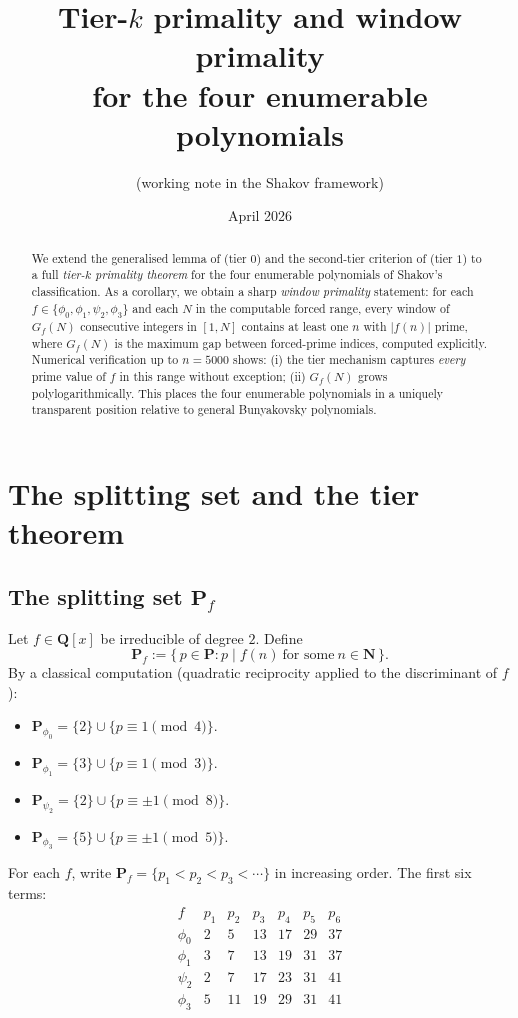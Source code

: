 \documentclass[11pt]{article}
\title{Tier-$k$ primality and window primality\\
for the four enumerable polynomials}
\author{(working note in the Shakov framework)}
\date{April 2026}
\theoremstyle{definition}
\newcommand{\N}{\mathbf{N}}
\newcommand{\Q}{\mathbf{Q}}
\newcommand{\PP}{\mathbf{P}}
\begin{document}
\maketitle

\begin{abstract}
We extend the generalised lemma of \cite{B8} (tier $0$) and the second-tier criterion of \cite[Theorem 5.1]{P2} (tier $1$) to a full \emph{tier-$k$ primality theorem} for the four enumerable polynomials of Shakov's classification. As a corollary, we obtain a sharp \emph{window primality} statement: for each $f \in \{\phi_0, \phi_1, \psi_2, \phi_3\}$ and each $N$ in the computable forced range, every window of $G_f(N)$ consecutive integers in $[1,N]$ contains at least one $n$ with $|f(n)|$ prime, where $G_f(N)$ is the maximum gap between forced-prime indices, computed explicitly. Numerical verification up to $n=5000$ shows: (i) the tier mechanism captures \emph{every} prime value of $f$ in this range without exception; (ii) $G_f(N)$ grows polylogarithmically. This places the four enumerable polynomials in a uniquely transparent position relative to general Bunyakovsky polynomials.
\end{abstract}

\tableofcontents

\section{The splitting set and the tier theorem}\label{sec:tier}

\subsection{The splitting set $\PP_f$}

Let $f \in \Q[x]$ be irreducible of degree $2$. Define
\[
\PP_f := \{\,p \in \PP : p \mid f(n)\ \text{for some}\ n \in \N\,\}.
\]
By a classical computation (quadratic reciprocity applied to the discriminant of $f$):
\begin{itemize}
\item $\PP_{\phi_0} = \{2\} \cup \{p \equiv 1 \pmod 4\}$.
\item $\PP_{\phi_1} = \{3\} \cup \{p \equiv 1 \pmod 3\}$.
\item $\PP_{\psi_2} = \{2\} \cup \{p \equiv \pm 1 \pmod 8\}$.
\item $\PP_{\phi_3} = \{5\} \cup \{p \equiv \pm 1 \pmod 5\}$.
\end{itemize}
For each $f$, write $\PP_f = \{p_1 < p_2 < p_3 < \cdots\}$ in increasing order. The first six terms:
\[
\begin{array}{l|llllll}
f & p_1 & p_2 & p_3 & p_4 & p_5 & p_6 \\
\hline
\phi_0 & 2 & 5 & 13 & 17 & 29 & 37 \\
\phi_1 & 3 & 7 & 13 & 19 & 31 & 37 \\
\psi_2 & 2 & 7 & 17 & 23 & 31 & 41 \\
\phi_3 & 5 & 11 & 19 & 29 & 31 & 41 \\
\end{array}
\]
\end{document}
